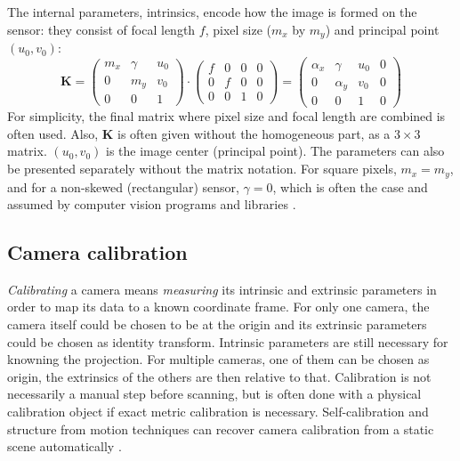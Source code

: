 The internal parameters, intrinsics, encode how the image is formed on the sensor: they consist of focal length $f$, pixel size ($m_x$ by $m_y$) and principal point $(u_0, v_0)$:
\begin{equation}
	\bm K =
	\begin{pmatrix}
		m_x & \gamma & u_0\\
		0   &    m_y & v_0\\
		0   &        0 & 1
	\end{pmatrix}
\cdot
	\begin{pmatrix}
		f & 0 & 0 & 0\\
		0 & f & 0 & 0\\
		0 & 0 & 1 & 0
	\end{pmatrix}
	=
	\begin{pmatrix}
		\alpha_x & \gamma   & u_0 & 0\\
		0        & \alpha_y & v_0 & 0\\
		0        & 0        & 1 & 0
	\end{pmatrix}
\end{equation}
For simplicity, the final matrix where pixel size and focal length are combined is often used.
Also, $\bm K$ is often given without the homogeneous part, as a $3 \times 3$ matrix.
$(u_0, v_0)$ is the image center (principal point).
The parameters can also be presented separately without the matrix notation.
For square pixels, $m_x = m_y$, and for a non-skewed (rectangular) sensor, $\gamma = 0$, which is often the case and assumed by computer vision programs and libraries \cite{hartley03multiview,szeliski10vision,heyden2005multiple}.



\subsection{Camera calibration} %

\emph{Calibrating} a camera means \emph{measuring} its intrinsic and extrinsic parameters in order to map its data to a known coordinate frame.
For only one camera, the camera itself could be chosen to be at the origin and its extrinsic parameters could be chosen as identity transform.
Intrinsic parameters are still necessary for knowning the projection.
For multiple cameras, one of them can be chosen as origin, the extrinsics of the others are then relative to that.
Calibration is not necessarily a manual step before scanning, but is often done with a physical calibration object if exact metric calibration is necessary.
Self-calibration and structure from motion techniques can recover camera calibration from a static scene automatically \cite{pollefeys1999hand,hartley03multiview}.

